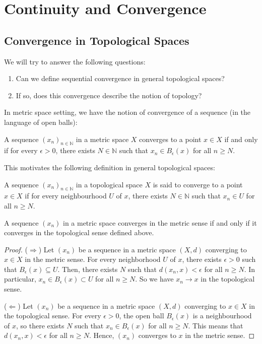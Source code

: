 \section{Continuity and Convergence}



\subsection{Convergence in Topological Spaces}

We will try to answer the following questions:

\begin{enumerate}
    \item Can we define sequential convergence in general topological spaces?
    \item If so, does this convergence describe the notion of topology?
\end{enumerate}

In metric space setting, we have the notion of convergence of a sequence (in the language of open balls):

\begin{proposition}
    A sequence $(x_n)_{n\in\mathbb{N}}$ in a metric space $X$ converges to a point $x\in X$ if and only if for every $\epsilon>0$, there exists $N\in\mathbb{N}$ such that $x_n\in B_\epsilon(x)$ for all $n\ge N$.
\end{proposition}

This motivates the following definition in general topological spaces:



\begin{definition}
    A sequence $(x_n)_{n\in\mathbb{N}}$ in a topological space $X$ is said to converge to a point $x\in X$ if for every neighbourhood $U$ of $x$, there exists $N\in\mathbb{N}$ such that $x_n\in U$ for all $n\ge N$.
\end{definition}

\begin{problem}
    A sequence $(x_n)$ in a metric space converges in the metric sense if and only if it converges in the topological sense defined above.
\end{problem}
\begin{proof}
    ($\Rightarrow$) Let $(x_n)$ be a sequence in a metric space $(X,d)$ converging to $x\in X$ in the metric sense. For every neighborhood $U$ of $x$, there exists $\epsilon>0$ such that $B_\epsilon(x)\subseteq U$. Then, there exists $N$ such that $d(x_n,x)<\epsilon$ for all $n\ge N$. In particular, $x_n\in B_\epsilon(x)\subset U$ for all $n\ge N$. So we have $x_n\to x$ in the topological sense.

    ($\Leftarrow$) Let $(x_n)$ be a sequence in a metric space $(X,d)$ converging to $x\in X$ in the topological sense. For every $\epsilon>0$, the open ball $B_\epsilon(x)$ is a neighbourhood of $x$, so there exists $N$ such that $x_n\in B_\epsilon(x)$ for all $n\ge N$. This means that $d(x_n,x)<\epsilon$ for all $n\ge N$. Hence, $(x_n)$ converges to $x$ in the metric sense.
\end{proof}



